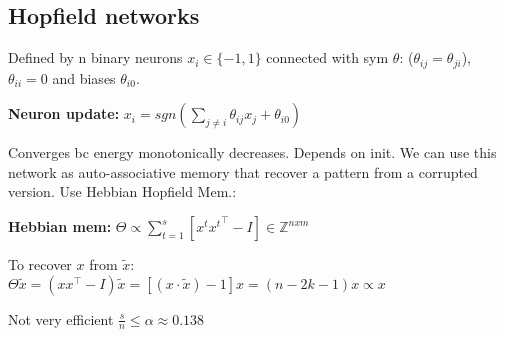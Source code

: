 \subsection*{Hopfield networks}
Defined by n binary neurons $x_i \in \{-1,1\}$ connected with sym $\theta$: ($\theta_{ij} = \theta_{ji}$), $\theta_{ii}=0$ and biases $\theta_{i0}$.

\textbf{Neuron update: } $x_i = sgn(\sum_{j\neq i}\theta_{ij}x_j+\theta_{i0})$

Converges bc energy monotonically decreases. Depends on init.
We can use this network as auto-associative memory that recover a pattern from a corrupted version. Use Hebbian Hopfield Mem.:

\textbf{Hebbian mem: } $\Theta \propto \sum_{t=1}^{s}[x^t{x^t}^{\top}-I] \in \mathbb{Z}^{nxm}$

To recover $x$ from $\tilde{x}$: $\Theta\tilde{x} = (xx^\top - I)\tilde{x} = [(x\cdot\tilde{x})-1]x = (n-2k-1)x \propto x$

Not very efficient $\frac{s}{n} \leq \alpha \approx 0.138$